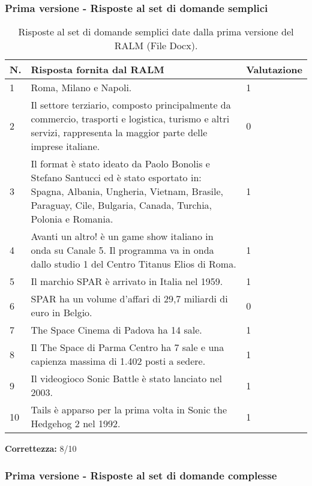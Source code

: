 \subsubsection{Prima versione - Risposte al set di domande semplici}

\begin{table}[H]
    \centering
    \begin{tabular}{|p{0.5cm} |p{6cm} |p{2cm}|}
        \hline
        \textbf{N}. & \textbf{Risposta fornita dal RALM} & \textbf{Valutazione} \\
        \hline
        1 & Roma, Milano e Napoli. & 1 \\
        \hline
        2 & Il settore terziario, composto principalmente da commercio, trasporti e logistica, turismo e altri servizi, rappresenta la maggior parte delle imprese italiane. & 0 \\
        \hline
        3 & Il format è stato ideato da Paolo Bonolis e Stefano Santucci ed è stato esportato in: Spagna, Albania, Ungheria, Vietnam, Brasile, Paraguay, Cile, Bulgaria, Canada, Turchia, Polonia e Romania. & 1 \\
        \hline
        4 & Avanti un altro! è un game show italiano in onda su Canale 5. Il programma va in onda dallo studio 1 del Centro Titanus Elios di Roma. & 1 \\
        \hline
        5 & Il marchio SPAR è arrivato in Italia nel 1959. & 1 \\
        \hline
        6 & SPAR ha un volume d'affari di 29,7 miliardi di euro in Belgio. & 0 \\
        \hline
        7 & The Space Cinema di Padova ha 14 sale. & 1 \\
        \hline
        8 & Il The Space di Parma Centro ha 7 sale e una capienza massima di 1.402 posti a sedere. & 1 \\
        \hline
        9 & Il videogioco Sonic Battle è stato lanciato nel 2003. & 1 \\
        \hline
        10 & Tails è apparso per la prima volta in Sonic the Hedgehog 2 nel 1992. & 1 \\
        \hline
    \end{tabular}
    \caption{Risposte al set di domande semplici date dalla prima versione del RALM (File Docx).}
\end{table}

\textbf{Correttezza:} 8/10

\subsubsection{Prima versione - Risposte al set di domande complesse}


